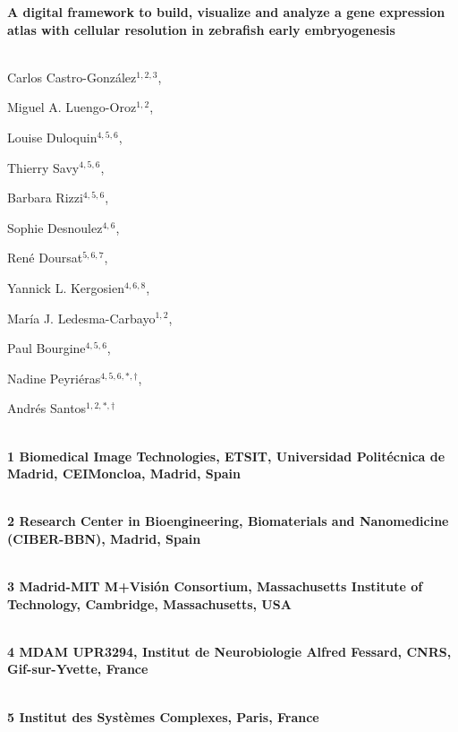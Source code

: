 




\begin{flushleft}

{\Large

\textbf{A digital framework to build, visualize and analyze a gene expression atlas with cellular resolution in zebrafish early embryogenesis}

}


\\

Carlos Castro-Gonz{\'a}lez$^{1,2,3}$,

Miguel A. Luengo-Oroz$^{1,2}$,

Louise Duloquin$^{4,5,6}$,

Thierry Savy$^{4,5,6}$,

Barbara Rizzi$^{4,5,6}$,

Sophie Desnoulez$^{4,6}$,

Ren{\'e} Doursat$^{5,6,7}$,

Yannick L. Kergosien$^{4,6,8}$,

Mar{\'i}a J. Ledesma-Carbayo$^{1,2}$,

Paul Bourgine$^{4,5,6}$,

Nadine Peyri{\'e}ras$^{4,5,6,\ast,\dag}$,

Andr{\'e}s Santos$^{1,2,\ast,\dag}$

\\

\bf{1} Biomedical Image Technologies, ETSIT, Universidad Polit{\'e}cnica de Madrid, CEIMoncloa, Madrid, Spain

\\

\bf{2} Research Center in Bioengineering, Biomaterials and Nanomedicine (CIBER-BBN), Madrid, Spain

\\

\bf{3} Madrid-MIT M+Visi{\'o}n Consortium, Massachusetts Institute of Technology, Cambridge, Massachusetts, USA

\\

\bf{4} MDAM UPR3294, Institut de Neurobiologie Alfred Fessard, CNRS, Gif-sur-Yvette, France

\\

\bf{5} Institut des Syst{\`e}mes Complexes, Paris, France


\end{flushleft}
